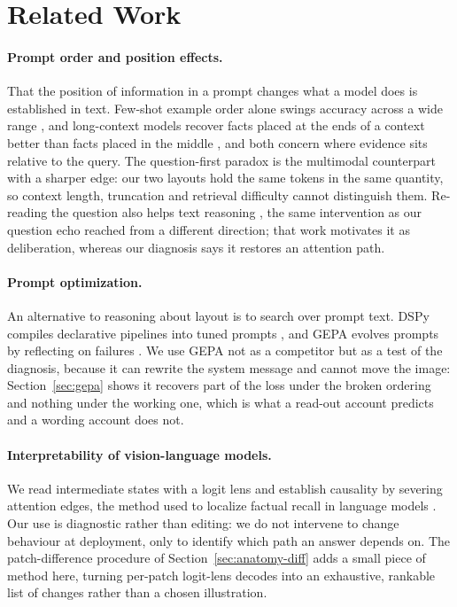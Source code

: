 \section{Related Work}
\label{sec:related}

\paragraph{Prompt order and position effects.} That the position of information
in a prompt changes what a model does is established in text. Few-shot example
order alone swings accuracy across a wide range \citep{fantasticallyordered2022},
and long-context models recover facts placed at the ends of a context better
than facts placed in the middle \citep{lostinthemiddle2024}, and both concern
where evidence sits relative to the query. The question-first
paradox is the multimodal counterpart with a sharper edge: our two layouts hold
the same tokens in the same quantity, so context length, truncation and
retrieval difficulty cannot distinguish them. Re-reading the question also helps
text reasoning \citep{rereading2024}, the same intervention as our question echo
reached from a different direction; that work motivates it as deliberation,
whereas our diagnosis says it restores an attention path.

\paragraph{Prompt optimization.} An alternative to reasoning about layout is to
search over prompt text. DSPy compiles declarative pipelines into tuned prompts
\citep{dspy2024}, and GEPA evolves prompts by reflecting on failures
\citep{gepa2025}. We use GEPA not as a competitor but as a test of the
diagnosis, because it can rewrite the system message and cannot move the image:
Section~\ref{sec:gepa} shows it recovers part of the loss under the broken
ordering and nothing under the working one, which is what a read-out account
predicts and a wording account does not.

\paragraph{Interpretability of vision-language models.} We read intermediate
states with a logit lens \citep{logitlens2020,tunedlens2023} and establish
causality by severing attention edges, the method used to localize factual
recall in language models \citep{attnknockout2023,rome2022}. Our use is
diagnostic rather than editing: we do not intervene to change behaviour at
deployment, only to identify which path an answer depends on. The
patch-difference procedure of Section~\ref{sec:anatomy-diff} adds a small piece
of method here, turning per-patch logit-lens decodes into an exhaustive,
rankable list of changes rather than a chosen illustration.

